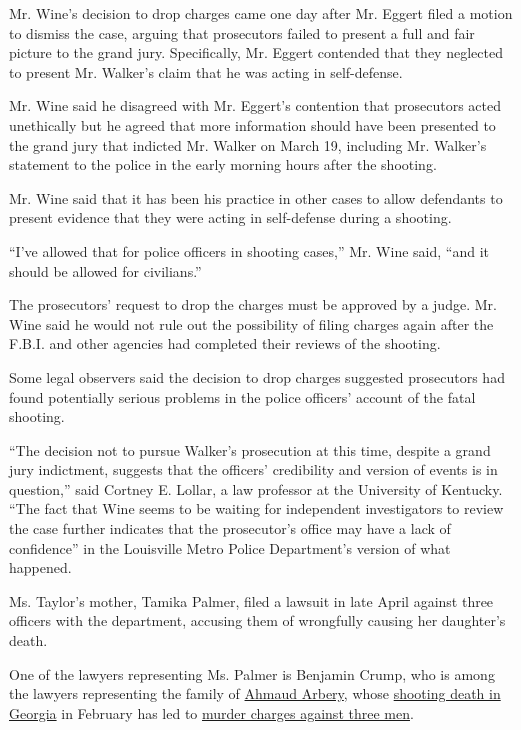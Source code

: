 Mr. Wine's decision to drop charges came one day after Mr. Eggert filed
a motion to dismiss the case, arguing that prosecutors failed to present
a full and fair picture to the grand jury. Specifically, Mr. Eggert
contended that they neglected to present Mr. Walker's claim that he was
acting in self-defense.

Mr. Wine said he disagreed with Mr. Eggert's contention that prosecutors
acted unethically but he agreed that more information should have been
presented to the grand jury that indicted Mr. Walker on March 19,
including Mr. Walker's statement to the police in the early morning
hours after the shooting.

Mr. Wine said that it has been his practice in other cases to allow
defendants to present evidence that they were acting in self-defense
during a shooting.

``I've allowed that for police officers in shooting cases,'' Mr. Wine
said, ``and it should be allowed for civilians.''

The prosecutors' request to drop the charges must be approved by a
judge. Mr. Wine said he would not rule out the possibility of filing
charges again after the F.B.I. and other agencies had completed their
reviews of the shooting.

Some legal observers said the decision to drop charges suggested
prosecutors had found potentially serious problems in the police
officers' account of the fatal shooting.

``The decision not to pursue Walker's prosecution at this time, despite
a grand jury indictment, suggests that the officers' credibility and
version of events is in question,'' said Cortney E. Lollar, a law
professor at the University of Kentucky. ``The fact that Wine seems to
be waiting for independent investigators to review the case further
indicates that the prosecutor's office may have a lack of confidence''
in the Louisville Metro Police Department's version of what happened.

Ms. Taylor's mother, Tamika Palmer, filed a lawsuit in late April
against three officers with the department, accusing them of wrongfully
causing her daughter's death.

One of the lawyers representing Ms. Palmer is Benjamin Crump, who is
among the lawyers representing the family of
\href{https://www.nytimes3xbfgragh.onion/article/ahmaud-arbery-shooting-georgia.html}{Ahmaud
Arbery}, whose
\href{https://www.nytimes3xbfgragh.onion/2020/04/26/us/ahmed-arbery-shooting-georgia.html}{shooting
death in Georgia} in February has led to
\href{https://www.nytimes3xbfgragh.onion/2020/05/21/us/william-bryan-arrest-ahmaud-arbery.html}{murder
charges against three men}.

